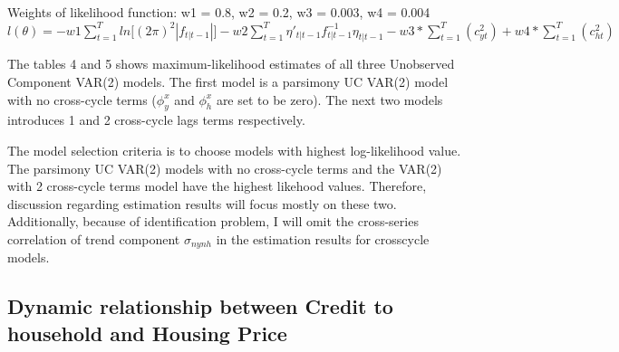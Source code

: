 \documentclass[12pt]{article}
\begin{document}
\begin{outline}[enumerate]
\begin{landscape}
\begin{table}[]
\begin{threeparttable}
\begin{tabular}{@{}lSSSSSS@{}}
												
						\bottomrule
					\end{tabular}
					\begin{tablenotes}
						\small
						\item Weights of likelihood function: w1 = 0.8, w2 = 0.2, w3 = 0.003, w4 = 0.004 \\
						$l(\theta) = -w1\sum_{t=1}^{T}ln\lbrack(2\pi)^2|f_{t|t-1}|\rbrack
						-w2\sum_{t=1}^{T}\eta'_{t|t-1}f^{-1}_{t|t-1}\eta_{t|t-1}
						- w3*\sum_{t=1}^{T}(c_{yt}^2) + w4*\sum_{t=1}^{T}(c_{ht}^2)$
					\end{tablenotes}
				\end{threeparttable}
			\end{table}
			
		\end{landscape}
		
		\clearpage
		
		
		The tables 4 and 5 shows maximum-likelihood estimates of all three Unobserved Component VAR(2) models. The first model is a parsimony UC VAR(2) model with no cross-cycle terms ($\phi^x_y$ and $\phi^x_h$ are set to be zero). The next two models introduces 1 and 2 cross-cycle lags terms respectively. 
		
		The model selection criteria is to choose models with highest log-likelihood value. The parsimony UC VAR(2) models with no cross-cycle terms and the VAR(2) with 2 cross-cycle terms model have the highest likehood values. Therefore, discussion regarding estimation results will focus mostly on these two. Additionally, because of identification problem, I will omit the cross-series correlation of trend component $\sigma_{nynh}$ in the estimation results for crosscycle models.
		
		\subsection{Dynamic relationship between Credit to household and Housing Price}
		

\end{outline}
\end{document}
